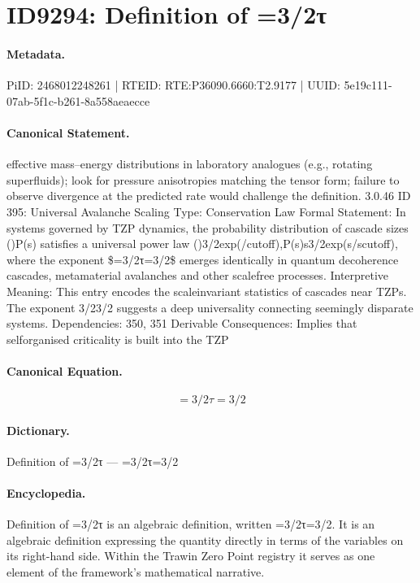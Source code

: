 \section*{ID9294: Definition of =3/2τ}
\paragraph{Metadata.}
PiID: 2468012248261 | RTEID: RTE:P36090.6660:T2.9177 | UUID: 5e19c111-07ab-5f1c-b261-8a558aeaecce

\paragraph{Canonical Statement.}
effective mass–energy distributions in laboratory analogues (e.g., rotating superfluids); look for pressure anisotropies matching the tensor form; failure to observe divergence at the predicted rate would challenge the definition. 3.0.46 ID 395: Universal Avalanche Scaling Type: Conservation Law Formal Statement: In systems governed by TZP dynamics, the probability distribution of cascade sizes ()P(s) satisfies a universal power law ()3/2exp(/cutoff),P(s)s3/2exp(s/scutoff), where the exponent \$=3/2τ=3/2\$ emerges identically in quantum decoherence cascades, metamaterial avalanches and other scalefree processes. Interpretive Meaning: This entry encodes the scaleinvariant statistics of cascades near TZPs. The exponent 3/23/2 suggests a deep universality connecting seemingly disparate systems. Dependencies: 350, 351 Derivable Consequences: Implies that selforganised criticality is built into the TZP

\paragraph{Canonical Equation.}
\[
=3/2τ=3/2
\]

\paragraph{Dictionary.}
Definition of =3/2τ — =3/2τ=3/2

\paragraph{Encyclopedia.}
Definition of =3/2τ is an algebraic definition, written =3/2τ=3/2. It is an algebraic definition expressing the quantity directly in terms of the variables on its right-hand side. Within the Trawin Zero Point registry it serves as one element of the framework's mathematical narrative.
